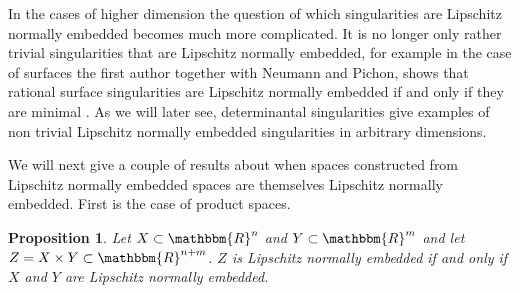 \documentclass[a4paper,oneside]{amsart}
\newtheorem{prop}[thm]{Proposition}
\theoremstyle{definition}
\begin{document}
In the cases of higher dimension the question of which singularities
are Lipschitz normally embedded becomes much more complicated. It is no
longer only rather trivial singularities that are Lipschitz normally
embedded, for example in the case of surfaces the first author
together with Neumann and Pichon, shows that rational surface
singularities are Lipschitz normally embedded if and only if they are
minimal \cite{normallyembedded}. As we will later see, determinantal
singularities give examples of non trivial Lipschitz normally
embedded singularities in arbitrary dimensions.

We will next give a couple of results about when spaces constructed from
Lipschitz normally embedded spaces are themselves Lipschitz normally
embedded. First is the case of product spaces.

\begin{prop}\label{product}
Let $X\subset {\mathbbm{R}}^n$ and $Y\subset {\mathbbm{R}}^m$ and let $Z = X\times Y
\subset {\mathbbm{R}}^{n+m}$. $Z$ is Lipschitz normally embedded if and only if
$X$ and $Y$ are Lipschitz normally embedded.
\end{prop}
\end{document}
